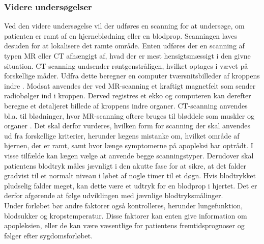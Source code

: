 \subsubsection{Videre undersøgelser}
Ved den videre undersøgelse vil der udføres en scanning for at undersøge, om patienten er ramt af en hjerneblødning eller en blodprop. Scanningen laves desuden for at lokalisere det ramte område. Enten udføres der en scanning af typen MR eller CT afhængigt af, hvad der er mest hensigtsmæssigt i den givne situation. CT-scanning undsender røntgenstråligen, hvilket optages i vævet på forskellige måder. Udfra dette beregner en computer tværsnitsbilleder af kroppens indre . Modsat anvendes der ved MR-scanning et kraftigt magnetfelt som sender radiobølger ind i kroppen. Derved registres et ekko og computeren kan derefter beregne et detaljeret billede af kroppens indre organer. CT-scanning anvendes bl.a. til blødninger, hvor MR-scanning oftere bruges til bløddele som muskler og organer .   
Det skal derfor vurderes, hvilken form for scanning der skal anvendes ud fra forskellige kriterier, herunder lægens mistanke om, hvilket område af hjernen, der er ramt, samt hvor længe symptomerne på apopleksi har optrådt. I visse tilfælde kan lægen vælge at anvende begge scanningstyper.  
Derudover skal patientens blodtryk måles jævnligt i den akutte fase for at sikre, at det falder gradvist til et normalt niveau i løbet af nogle timer til et døgn. Hvis blodtrykket pludselig falder meget, kan dette være et udtryk for en blodprop i hjertet. Det er derfor afgørende at følge udviklingen med jævnlige blodtryksmålinger. \cite{Sundhedsstyrelsen2009}
\\
Under forløbet bør andre faktorer også kontrolleres, herunder lungefunktion, blodsukker og kropstemperatur. Disse faktorer kan enten give information om apopleksien, eller de kan være væsentlige for patientens fremtidsprognoser og følger efter sygdomsforløbet. \cite{Sundhedsstyrelsen2009}
\\

